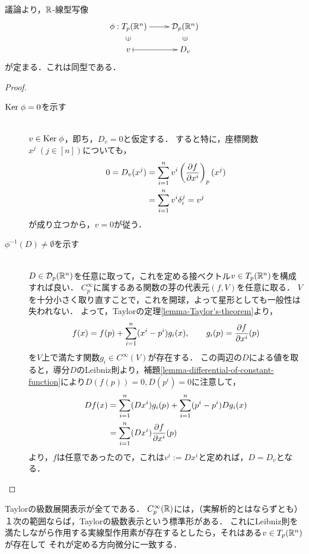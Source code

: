 \documentclass[uplatex,dvipdfmx]{jsreport}
\begin{document}
\begin{theorem}[接ベクトルと導分の同一視]\label{thm-isomorphism-between-tangent-vector-and-point-derivative}
    議論より，$\mathbb{R}$-線型写像
    \[\xymatrix@R-2pc{
        \phi:T_p(\R^n)\ar[r]&\cD_p(\R^n)\\
        \rotatebox[origin=c]{90}{$\in$}&\rotatebox[origin=c]{90}{$\in$}\\
        v\ar@{|->}[r]&D_v
    }\]
    が定まる．これは同型である．
\end{theorem}
\begin{proof}\mbox{}
    \begin{description}
        \item[$\mathrm{Ker}\;\phi=0$を示す] \mbox{}\\$v\in\mathrm{Ker}\;\phi$，即ち，$D_v=0$と仮定する．
        すると特に，座標関数$x^j\;(j\in[n])$についても，
        \begin{align*}
            0=D_v(x^j)&=\sum^n_{i=1}v^i\left(\frac{\partial f}{\partial x^i}\right)_p(x^j)\\
            &=\sum^n_{i=1}v^i\delta^j_i=v^j
        \end{align*}
        が成り立つから，$v=0$が従う．
        \item[$\phi^{-1}(D)\ne\emptyset$を示す] \mbox{}\\
        $D\in\mathcal{D}_p(\mathbb{R}^n)$を任意に取って，これを定める接ベクトル$v\in T_p(\mathbb{R}^n)$を構成すれば良い．
        $C^\infty_p$に属するある関数の芽の代表元$(f,V)$を任意に取る．
        $V$を十分小さく取り直すことで，これを開球，よって星形としても一般性は失われない．
        よって，Taylorの定理\ref{lemma-Taylor's-theorem}より，
        \[f(x)=f(p)+\sum^n_{i=1}(x^i-p^i)g_i(x),\qquad g_i(p)=\frac{\partial f}{\partial x^i}(p)\]
        を$V$上で満たす関数$g_i\in C^\infty(V)$が存在する．
        この両辺の$D$による値を取ると，導分$D$のLeibniz則より，補題\ref{lemma-differential-of-constant-function}により$D(f(p))=0,D(p^i)=0$に注意して，
        \begin{align*}
            Df(x)&=\sum^n_{i=1}(Dx^i)g_i(p)+\sum_{i=1}^n(p^i-p^i)Dg_i(x)\\
            &=\sum^n_{i=1}(Dx^i)\frac{\partial f}{\partial x^i}(p)
        \end{align*}
        より，$f$は任意であったので，これは$v^i:=Dx^i$と定めれば，$D=D_v$となる．
    \end{description}
\end{proof}
\begin{remarks}
    Taylorの級数展開表示が全てである．
    $C_p^\infty(\mathbb{R})$には，（実解析的とはならずとも）１次の範囲ならば，Taylorの級数表示という標準形がある．
    これにLeibniz則を満たしながら作用する実線型作用素が存在するとしたら，それはある$v\in T_p(\mathbb{R}^n)$が存在して
    それが定める方向微分に一致する．
\end{remarks}
\end{document}
